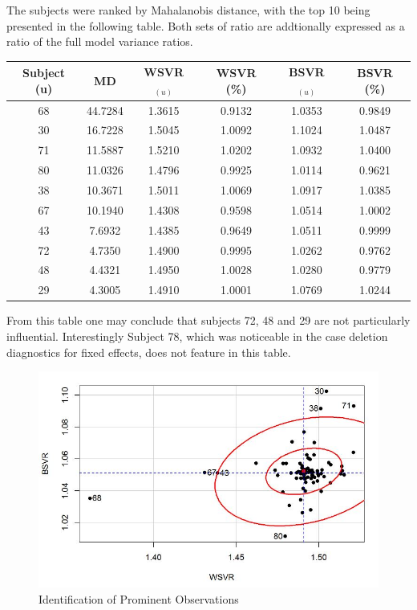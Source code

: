 \documentclass[12pt, a4paper]{report}
\theoremstyle{definition}
\theoremstyle{remark}
\begin{document}
The subjects were ranked by Mahalanobis distance, with the top 10 being presented in the following table. Both sets of ratio are addtionally expressed as a ratio of the full model variance ratios.
\begin{center}
\begin{tabular}{|c|c|c|c|c|c|}
\hline
Subject (u) &  MD & WSVR$_{(u)}$ & WSVR (\%) & BSVR$_{(u)}$   & BSVR (\%)     \\ \hline \hline
68 & 44.7284   & 1.3615  & 0.9132   & 1.0353  & 0.9849 \\ \hline
30 & 16.7228   & 1.5045  & 1.0092   & 1.1024  & 1.0487 \\ \hline
71 & 11.5887   & 1.5210  & 1.0202   & 1.0932  & 1.0400 \\ \hline
80 & 11.0326   & 1.4796  & 0.9925   & 1.0114  & 0.9621 \\ \hline
38 & 10.3671   & 1.5011  & 1.0069   & 1.0917  & 1.0385 \\ \hline
67 & 10.1940   & 1.4308  & 0.9598   & 1.0514  & 1.0002 \\ \hline
43  & 7.6932   & 1.4385  & 0.9649   & 1.0511  & 0.9999 \\ \hline
72  & 4.7350   & 1.4900  & 0.9995   & 1.0262  & 0.9762 \\ \hline
48  & 4.4321   & 1.4950  & 1.0028   & 1.0280  & 0.9779 \\ \hline
29  & 4.3005   & 1.4910  & 1.0001   & 1.0769  & 1.0244 \\ \hline
\end{tabular}
\end{center}
From this table one may conclude that subjects 72, 48 and 29 are not particularly influential. Interestingly Subject 78, which was noticeable in the case deletion diagnostics for fixed effects, does not feature in this table.

\begin{figure}[h!]
\centering
\includegraphics[width=0.9\linewidth]{08-plot1}
\caption{Identification of Prominent Observations}
\label{fig:08-plot1}
\end{figure}
\end{document}
